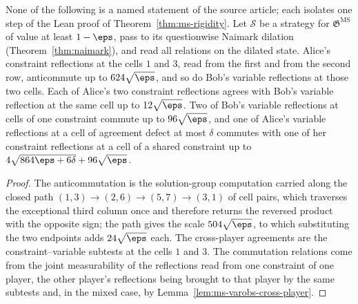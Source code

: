 \begin{lemma}\label{lem:ms-rigidity-support-second-pair}
	\leanok
	None of the following is a named statement of the source article; each isolates one step of the Lean proof of Theorem~\ref{thm:ms-rigidity}. Let $\mathcal S$ be a strategy for $\mathfrak{G}^{\mathrm{MS}}$ of value at least $1 - \eps$, pass to its questionwise Naimark dilation (Theorem~\ref{thm:naimark}), and read all relations on the dilated state. Alice's constraint reflections at the cells $1$ and $3$, read from the first and from the second row, anticommute up to $624\sqrt\eps$, and so do Bob's variable reflections at those two cells. Each of Alice's two constraint reflections agrees with Bob's variable reflection at the same cell up to $12\sqrt\eps$. Two of Bob's variable reflections at cells of one constraint commute up to $96\sqrt\eps$, and one of Alice's variable reflections at a cell of agreement defect at most $\delta$ commutes with one of her constraint reflections at a cell of a shared constraint up to $4\sqrt{864\eps + 6\delta} + 96\sqrt\eps$.
\end{lemma}
\begin{proof}
	\leanok
	The anticommutation is the solution-group computation carried along the closed path $(1,3) \to (2,6) \to (5,7) \to (3,1)$ of cell pairs, which traverses the exceptional third column once and therefore returns the reversed product with the opposite sign; the path gives the scale $504\sqrt\eps$, to which substituting the two endpoints adds $24\sqrt\eps$ each. The cross-player agreements are the constraint--variable subtests at the cells $1$ and $3$. The commutation relations come from the joint measurability of the reflections read from one constraint of one player, the other player's reflections being brought to that player by the same subtests and, in the mixed case, by Lemma~\ref{lem:ms-varobs-cross-player}.
\end{proof}

